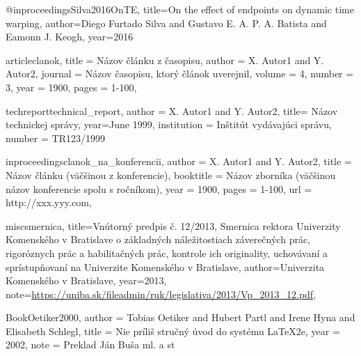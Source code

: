 @inproceedings{Silva2016OnTE,
  title={On the effect of endpoints on dynamic time warping},
  author={Diego Furtado Silva and Gustavo E. A. P. A. Batista and Eamonn J. Keogh},
  year={2016}
}

article{clanok,
    title = 	{Názov článku z časopisu},
    author =	{X. Autor1 and Y. Autor2},
    journal = {Názov časopisu, ktorý článok uverejnil},
    volume = {4},
    number = {3},
    year = {1900},
    pages = {1-100},
}


techreport{technical_report,
    author =	{X. Autor1 and Y. Autor2},
    title= {Názov technickej správy},
    year={June 1999},
    institution = {Inštitút vydávajúci správu},
    number = {TR123/1999}
}

inproceedings{clanok_na_konferencii,
    author =	{X. Autor1 and Y. Autor2},
    title = {Názov článku (väčšinou z konferencie)},
    booktitle = {Názov zborníka (väčšinou názov konferencie spolu s ročníkom)},
    year = {1900},
    pages = {1-100},
    url = {http://xxx.yyy.com},
}    

misc{smernica,
 title={Vnútorný predpis č. 12/2013,
Smernica rektora {U}niverzity {K}omenského v {B}ratislave
o základných náležitostiach záverečných prác, rigoróznych 
prác a habilitačných prác, kontrole ich  originality, 
uchovávaní a sprístupňovaní  na {U}niverzite {K}omenského v {B}ratislave},
 author={{Univerzita Komenského v Bratislave}},
 year={2013},
 note={\url{https://uniba.sk/fileadmin/ruk/legislativa/2013/Vp_2013_12.pdf}},
}

Book{Oetiker2000,
  author = 	 {Tobias Oetiker and Hubert Partl and Irene Hyna and Elisabeth Schlegl},
  title = 	 {Nie príliš stručný úvod do systému LaTeX2e},
  year = 	 {2002},
  note = {Preklad Ján Buša ml. a st}
}
